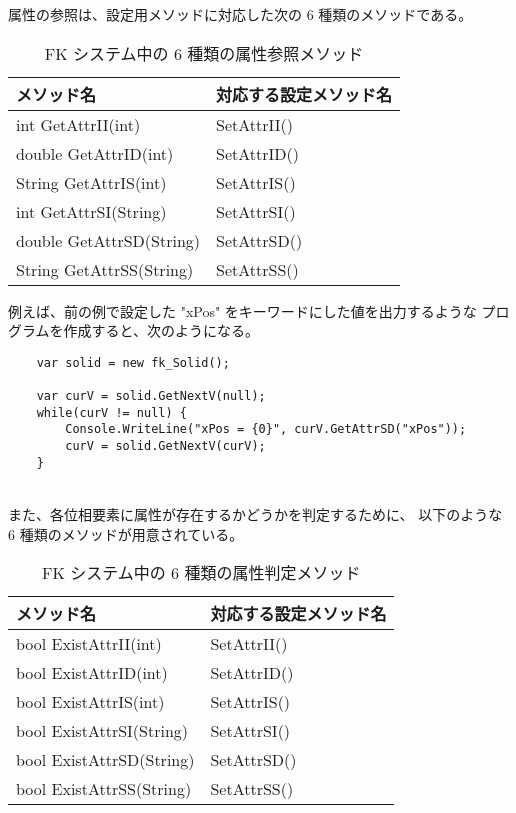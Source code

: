 属性の参照は、設定用メソッドに対応した次の 6 種類のメソッドである。

\begin{table}[H]
\caption{FK システム中の 6 種類の属性参照メソッド}
\label{tbl:attr2}
\begin{center}
\begin{tabular}{|l|l|}
\hline
メソッド名 & 対応する設定メソッド名 \\ \hline
int GetAttrII(int)		& SetAttrII()	\\ \hline
double GetAttrID(int)		& SetAttrID()	\\ \hline
String GetAttrIS(int)		& SetAttrIS()	\\ \hline
int GetAttrSI(String)		& SetAttrSI()	\\ \hline
double GetAttrSD(String)	& SetAttrSD()	\\ \hline
String GetAttrSS(String)	& SetAttrSS()	\\ \hline
\end{tabular}
\end{center}
\end{table}

例えば、前の例で設定した "xPos" をキーワードにした値を出力するような
プログラムを作成すると、次のようになる。
\\
\begin{breakbox}
\begin{verbatim}
    var solid = new fk_Solid();

    var curV = solid.GetNextV(null);
    while(curV != null) {
        Console.WriteLine("xPos = {0}", curV.GetAttrSD("xPos"));
        curV = solid.GetNextV(curV);
    }
\end{verbatim}
\end{breakbox}
~ \\
また、各位相要素に属性が存在するかどうかを判定するために、
以下のような 6 種類のメソッドが用意されている。

\begin{table}[H]
\caption{FK システム中の 6 種類の属性判定メソッド}
\label{tbl:attr3}
\begin{center}
\begin{tabular}{|l|l|}
\hline
メソッド名 & 対応する設定メソッド名 \\ \hline
bool ExistAttrII(int)		& SetAttrII()	\\ \hline
bool ExistAttrID(int)		& SetAttrID()	\\ \hline
bool ExistAttrIS(int)		& SetAttrIS()	\\ \hline
bool ExistAttrSI(String)	& SetAttrSI()	\\ \hline
bool ExistAttrSD(String)	& SetAttrSD()	\\ \hline
bool ExistAttrSS(String)	& SetAttrSS()	\\ \hline
\end{tabular}
\end{center}
\end{table}

